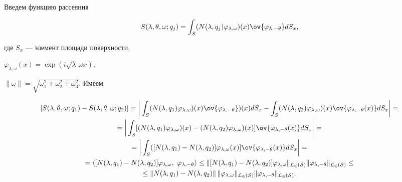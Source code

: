 Введем функцию рассеяния 


$$ 


S(\lambda,\theta,\omega;q_j)=\int_S(N(\lambda,q_j) 


\varphi_{\lambda,\omega})(x)\ov{\varphi_{\lambda,-\theta}}d S_x, 


$$ 


где $S_x$ --- элемент площади поверхности, 


$\varphi_{\lambda,\omega}(x)=\exp(i\sqrt{\lambda}\,\omega x)$, 


$\|\omega\|=\sqrt{\omega^2_1+\omega^2_2+\omega^2_3}$. Имеем 


\begin{gather*} 


|S(\lambda,\theta,\omega;q_1)- 


S(\lambda,\theta,\omega;q_2)|=\bigg|\int_S 


(N(\lambda,q_1)\varphi_{\lambda,\omega})(x) 


\ov{\varphi_{\lambda,-\theta}})(x)d S_x -


\int_S(N(\lambda,q_2)\varphi_{\lambda,\omega})(x) 


\ov{\varphi_{\lambda,-\theta}(x)}d S_x\bigg|=\\ 


% 


=\bigg|\int_S[(N(\lambda,q_1)\varphi_{\lambda,\omega})(x) 


-(N(\lambda,q_2)\varphi_{\lambda,\omega})(x)]


\ov{\varphi_{\lambda,-\theta}(x)}d S_x\bigg|= \\ 


% 


=\bigg|\int_S([N(\lambda,q_1)-N(\lambda,q_2)]


\varphi_{\lambda,\omega}(x)]\ov{\varphi_{\lambda,-\theta}(x)}


d S_x\bigg|=\\


%


=\langle[N(\lambda,q_1)-N(\lambda,q_2)] 


\varphi_{\lambda,\omega},\ \varphi_{\lambda,-\theta}\rangle \le 


\|[N(\lambda,q_1)-N(\lambda,q_2)]\varphi_{\lambda,\omega} 


\|_{\cal L_2(S)}\|\varphi_{\lambda,-\theta}\|_{\cal L_2(S)} \le \\ 


% 


\le\|N(\lambda,q_1)-N(\lambda,q_2)\|\, 


\|\varphi_{\lambda,\omega}\|_{\cal L_2(S)} 


\|\varphi_{\lambda,-\theta}\|_{\cal L_2(S)}. 


\end{gather*} 



